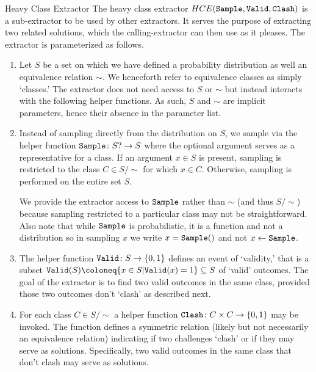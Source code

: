 \begin{theorem}{Heavy Class Extractor}
    The heavy class extractor $HCE(\mathtt{Sample},\mathtt{Valid},\mathtt{Clash})$ is a sub-extractor to be used by other extractors.
    It serves the purpose of extracting two related solutions, which the calling-extractor can then use as it pleases.
    The extractor is parameterized as follows.
    \begin{enumerate}
        \item
        Let $S$ be a set on which we have defined a probability distribution as well an equivalence relation $\sim$.
        We henceforth refer to equivalence classes as simply `classes.'
        The extractor does not need access to $S$ or $\sim$ but instead interacts with the following helper functions.
        As such, $S$ and $\sim$ are implicit parameters, hence their absence in the parameter list.

        \item
        Instead of sampling directly from the distribution on $S$, we sample via the helper function $\mathtt{Sample}\colon S?\to S$ where the optional argument serves as a representative for a class.
        If an argument $x\in S$ is present, sampling is restricted to the class $C\in S/\sim$ for which $x\in C$.
        Otherwise, sampling is performed on the entire set $S$.

        We provide the extractor access to $\mathtt{Sample}$ rather than $\sim$ (and thus $S/\sim$) because sampling restricted to a particular class may not be straightforward.
        Also note that while $\mathtt{Sample}$ is probabilistic, it is a function and not a distribution so in sampling $x$ we write $x=\mathtt{Sample}()$ and not $x\leftarrow\mathtt{Sample}$.

        \item
        The helper function $\mathtt{Valid}\colon S\to\{0,1\}$ defines an event of `validity,' that is a subset $\Valid(S)\coloneq\{x\in S|\Valid(x)=1\}\subseteq S$ of `valid' outcomes.
        The goal of the extractor is to find two valid outcomes in the same class, provided those two outcomes don't `clash' as described next.

        \item
        For each class $C\in S/\sim$ a helper function $\mathtt{Clash}\colon C\times C\to\{0,1\}$ may be invoked.
        The function defines a symmetric relation (likely but not necessarily an equivalence relation) indicating if two challenges `clash' or if they may serve as solutions.
        Specifically, two valid outcomes in the same class that don't clash may serve as solutions.
    \end{enumerate}


\end{theorem}

